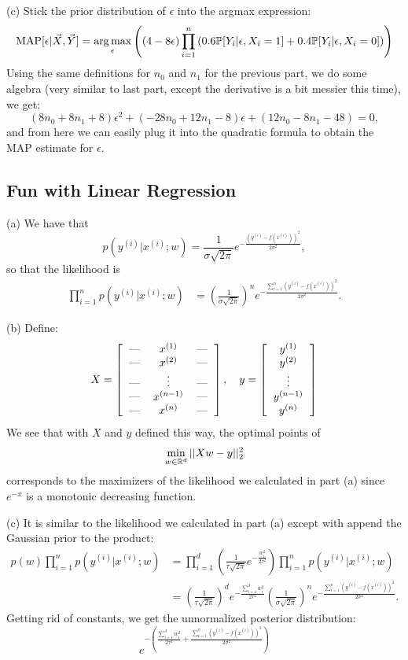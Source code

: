 (c) Stick the prior distribution of $\epsilon$ into the argmax expression:
\[
\text{MAP}[\epsilon | \vec{X}, \vec{Y}] = \operatorname*{arg\,max}_\epsilon \left((4 - 8\epsilon)\prod_{i = 1}^n\left(0.6\mathbb{P}[Y_i | \epsilon, X_i = 1] + 0.4\mathbb{P}[Y_i | \epsilon, X_i = 0]\right)\right)
\]
Using the same definitions for $n_0$ and $n_1$ for the previous part, we do some algebra (very similar to last part, except the derivative is a bit messier this time), we get:
\[
(8n_0 + 8n_1 + 8)\epsilon^2 + (-28n_0 + 12n_1 - 8)\epsilon + (12n_0 - 8n_1 - 48) = 0,
\]
and from here we can easily plug it into the quadratic formula to obtain the MAP estimate for $\epsilon$.


\subsection{Fun with Linear Regression}
(a) We have that
\[
p(y^{(i)} | x^{(i)}; w) = \frac{1}{\sigma\sqrt{2\pi}}e^{-\frac{\left(y^{(i)} - f(x^{(i)})\right)^2}{2\sigma^2}},
\]
so that the likelihood is
\begin{align*}
    \prod_{i = 1}^np(y^{(i)} | x^{(i)}; w) &= \left(\frac{1}{\sigma\sqrt{2\pi}}\right)^ne^{-\frac{\sum_{i = 1}^n\left(y^{(i)} - f(x^{(i)})\right)^2}{2\sigma^2}}.
\end{align*}

(b) Define:
\[
X = \left[\begin{tabular}{ccc}
--- & $x^{(1)}$ & ---\\
--- & $x^{(2)}$ & ---  \\
--- & $\vdots$ & --- \\
--- & $x^{(n - 1)}$ & --- \\
--- & $x^{(n)}$ & ---
\end{tabular}\right], \quad
y = \left[\begin{tabular}{c}
$y^{(1)}$ \\
$y^{(2)}$ \\
$\vdots$ \\
$y^{(n - 1)}$ \\
$y^{(n)}$
\end{tabular}\right]
\]
We see that with $X$ and $y$ defined this way, the optimal points of
\[
\min_{w \in \mathbb{R}^d}||Xw - y||_2^2
\]
corresponds to the maximizers of the likelihood we calculated in part (a) since $e^{-x}$ is a monotonic decreasing function.

(c) It is similar to the likelihood we calculated in part (a) except with append the Gaussian prior to the product:
\begin{align*}
p(w)\prod_{i = 1}^np(y^{(i)} | x^{(i)}; w) &= \prod_{i = 1}^d\left(\frac{1}{\tau\sqrt{2\pi}}e^{-\frac{w_i^2}{2\tau^2}}\right)\prod_{i = 1}^np(y^{(i)} | x^{(i)}; w) \\
    &= \left(\frac{1}{\tau\sqrt{2\pi}}\right)^d e^{-\frac{\sum_{i = 1}^d w_i^2}{2\tau^2}}\left(\frac{1}{\sigma\sqrt{2\pi}}\right)^n e^{-\frac{\sum_{i = 1}^n\left(y^{(i)} - f(x^{(i)})\right)^2}{2\sigma^2}}.
\end{align*}
Getting rid of constants, we get the unnormalized posterior distribution:
\[
e^{-\left(\frac{\sum_{i = 1}^d w_i^2}{2\tau^2} + \frac{\sum_{i = 1}^n\left(y^{(i)} - f(x^{(i)})\right)^2}{2\sigma^2}\right)}
\]

